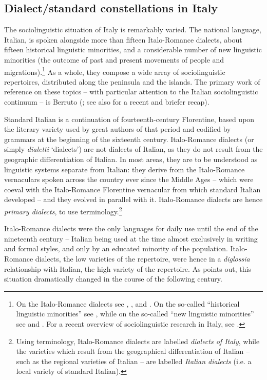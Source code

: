 \subsection{Dialect/standard constellations in Italy}
\hypertarget{Toc124860642}{}
The sociolinguistic situation of Italy is remarkably varied. The national language, Italian, is spoken alongside more than fifteen Italo-Romance dialects, about fifteen historical linguistic minorities, and a considerable number of new linguistic minorities (the outcome of past and present movements of people and migrations).\footnote{On the Italo-Romance dialects see \citet{MaidenParry1997}, \citet{GrassiEtAl1997}, and \citet{NegroVietti2011}. On the so-called “historical linguistic minorities” see \citet{Aquila2011}, while on the so-called “new linguistic minorities” see \citet{Chini2011} and \citet{Goglia2018}. For a recent overview of sociolinguistic research in Italy, see \citet{Alfonzetti2017}.} As a whole, they compose a wide array of sociolinguistic repertoires, distributed along the peninsula and the islands. The primary work of reference on these topics – with particular attention to the Italian sociolinguistic continuum – is Berruto (\citeyear{Berruto2012}; see also \citealt{Berruto2018} for a recent and briefer recap).

\hspace*{-0.5pt}Standard Italian is a continuation of fourteenth-century Florentine, based upon the literary variety used by great authors of that period and codified by grammars at the beginning of the sixteenth century. Italo-Romance dialects (or simply \textit{dialetti} ‘dialects’) are not dialects of Italian, as they do not result from the geographic differentiation of Italian. In most areas, they are to be understood as linguistic systems separate from Italian: they derive from the Italo-Romance vernaculars spoken across the country ever since the Middle Ages – which were coeval with the Italo-Romance Florentine vernacular from which standard Italian developed – and they evolved in parallel with it. Italo-Romance dialects are hence \textit{primary dialects}, to use  terminology.\footnote{Using  terminology, Italo-Romance dialects are labelled \textit{dialects of Italy}, while the varieties which result from the geographical differentiation of Italian – such as the regional varieties of Italian – are labelled \textit{Italian dialects} (i.e. a local variety of standard Italian).}

Italo-Romance dialects were the only languages for daily use until the end of the nineteenth century – Italian being used at the time almost exclusively in writing and formal styles, and only by an educated minority of the population. Italo-Romance dialects, the low varieties of the repertoire, were hence in a \textit{diglossia} relationship with Italian, the high variety of the repertoire. As \citet{Berruto2018} points out, this situation dramatically changed in the course of the following century.

